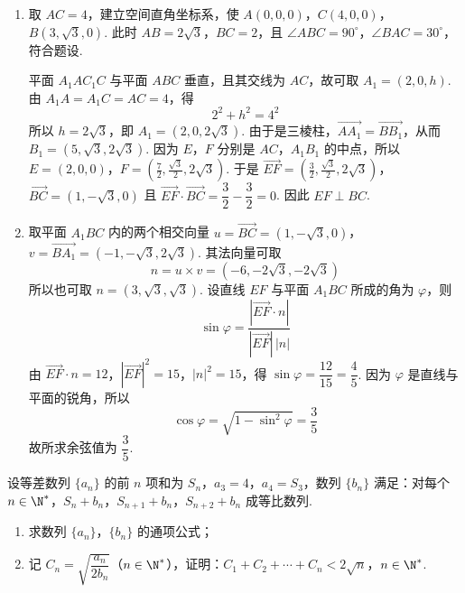 \begin{solution}
\begin{enumerate}
\item 取 \(AC=4\)，建立空间直角坐标系，使
\(A(0,0,0)\)，\(C(4,0,0)\)，\(B(3,\sqrt3,0)\).
此时 \(AB=2\sqrt3\)，\(BC=2\)，且 \(\angle ABC=90^\circ\)，\(\angle BAC=30^\circ\)，符合题设.

平面 \(A_1AC_1C\) 与平面 \(ABC\) 垂直，且其交线为 \(AC\)，故可取 \(A_1=(2,0,h)\). 由 \(A_1A=A_1C=AC=4\)，得
\[
2^2+h^2=4^2
\]
所以 \(h=2\sqrt3\)，即 \(A_1=(2,0,2\sqrt3)\). 由于是三棱柱，\(\overrightarrow{AA_1}=\overrightarrow{BB_1}\)，从而 \(B_1=(5,\sqrt3,2\sqrt3)\). 因为 \(E\)，\(F\) 分别是 \(AC\)，\(A_1B_1\) 的中点，所以
\(E=(2,0,0)\)，\(F=\left(\frac72,\frac{\sqrt3}{2},2\sqrt3\right)\).
于是
\(\overrightarrow{EF}=\left(\frac32,\frac{\sqrt3}{2},2\sqrt3\right)\)，\(\overrightarrow{BC}=(1,-\sqrt3,0)\)
且 \(\overrightarrow{EF}\cdot\overrightarrow{BC}=\dfrac32-\dfrac32=0\). 因此 \(EF\perp BC\).

\item 取平面 \(A_1BC\) 内的两个相交向量
\(u=\overrightarrow{BC}=(1,-\sqrt3,0)\)，\(v=\overrightarrow{BA_1}=(-1,-\sqrt3,2\sqrt3)\).
其法向量可取
\[
 n=u\times v=(-6,-2\sqrt3,-2\sqrt3)
\]
所以也可取 \(n=(3,\sqrt3,\sqrt3)\). 设直线 \(EF\) 与平面 \(A_1BC\) 所成的角为 \(\varphi\)，则
\[
\sin\varphi=\frac{|\overrightarrow{EF}\cdot n|}{|\overrightarrow{EF}|\,|n|}
\]
由 \(\overrightarrow{EF}\cdot n=12\)，\(|\overrightarrow{EF}|^2=15\)，\(|n|^2=15\)，得 \(\sin\varphi=\dfrac{12}{15}=\dfrac45\). 因为 \(\varphi\) 是直线与平面的锐角，所以
\[
\cos\varphi=\sqrt{1-\sin^2\varphi}=\frac35
\]
故所求余弦值为 \(\dfrac35\).
\end{enumerate}
\end{solution}

\begin{problem}
设等差数列 \(\{a_n\}\) 的前 \(n\) 项和为 \(S_n\)，\(a_3=4\)，\(a_4=S_3\)，数列 \(\{b_n\}\) 满足：对每个 \(n\in\N^*\)，\(S_n+b_n\)，\(S_{n+1}+b_n\)，\(S_{n+2}+b_n\) 成等比数列.

\begin{enumerate}
  \item 求数列 \(\{a_n\}\)，\(\{b_n\}\) 的通项公式；
  \item 记 \(C_n=\sqrt{\dfrac{a_n}{2b_n}}\)（\(n\in\N^*\)），证明：\(C_1+C_2+\cdots+C_n<2\sqrt n\)，\(n\in\N^*\).
\end{enumerate}
\end{problem}

